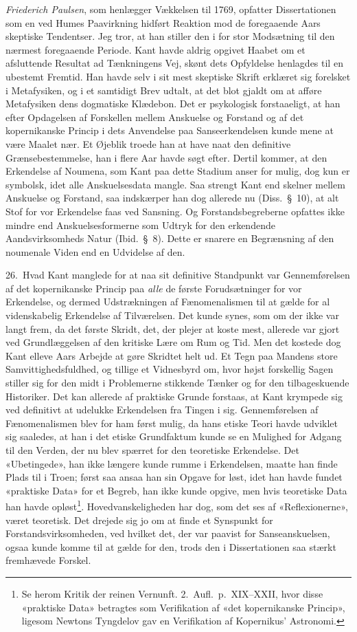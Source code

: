 \documentclass[12pt,a4paper]{article}
\newcommand{\apage}[1]{\marginnote{\footnotesize\textit{[#1]}}}
\begin{document}
\emph{Friederich Paulsen}, som henlægger Vækkelsen til 1769, opfatter
Dissertationen som en ved Humes Paavirkning hidført Reaktion mod de
foregaaende Aars skeptiske Tendentser. Jeg tror, at han stiller den i for
stor Modsætning til den nærmest foregaaende Periode. Kant havde aldrig
opgivet Haabet om et afsluttende Resultat ad Tænkningens Vej, skønt dets
Opfyldelse henlagdes til en ubestemt Fremtid. Han havde selv i sit mest
skeptiske Skrift erklæret sig forelsket i Metafysiken, og i et samtidigt
Brev udtalt, at det blot gjaldt om at afføre Metafysiken dens dogmatiske
Klædebon. Det er psykologisk forstaaeligt, at han efter Opdagelsen af
Forskellen mellem Anskuelse og Forstand og af det kopernikanske Princip i
dets Anvendelse paa Sanseerkendelsen kunde mene at være Maalet nær. Et
Øjeblik troede han at have naat den definitive Grænsebestemmelse, han i
flere Aar havde søgt efter. Dertil kommer, at den Erkendelse af Noumena,
som Kant paa dette Stadium anser for mulig, dog kun er symbolsk, idet
alle Anskuelsesdata mangle. Saa strengt Kant end skelner mellem Anskuelse
og Forstand, saa indskærper han dog allerede nu (Diss.\ §\ 10), at alt
Stof for vor Erkendelse faas ved Sansning. Og Forstandsbegreberne \apage{51}  opfattes
ikke mindre end Anskuelsesformerne som Udtryk for den erkendende
Aandsvirksomheds Natur (Ibid.\ §\ 8). Dette er snarere en Begrænsning af
den noumenale Viden end en Udvidelse af den.

26.\ Hvad Kant manglede for at naa sit definitive Standpunkt var
Gennemførelsen af det kopernikanske Princip paa \emph{alle} de første
Forudsætninger for vor Erkendelse, og dermed Udstrækningen af
Fænomenalismen til at gælde for al videnskabelig Erkendelse af
Tilværelsen. Det kunde synes, som om der ikke var langt frem, da det
første Skridt, det, der plejer at koste mest, allerede var gjort ved
Grundlæggelsen af den kritiske Lære om Rum og Tid. Men det kostede dog
Kant elleve Aars Arbejde at gøre Skridtet helt ud. Et Tegn paa Mandens
store Samvittighedsfuldhed, og tillige et Vidnesbyrd om, hvor højst
forskellig Sagen stiller sig for den midt i Problemerne stikkende Tænker
og for den tilbageskuende Historiker. Det kan allerede af praktiske
Grunde forstaas, at Kant krympede sig ved definitivt at udelukke
Erkendelsen fra Tingen i sig. Gennemførelsen af Fænomenalismen blev for
ham først mulig, da hans etiske Teori havde udviklet sig saaledes, at han
i det etiske Grundfaktum kunde se en Mulighed for Adgang til den Verden,
der nu blev spærret for den teoretiske Erkendelse. Det «Ubetingede», han
ikke længere kunde rumme i Erkendelsen, maatte han finde Plads til i
Troen; først saa ansaa han sin Opgave for løst, idet han havde fundet
«praktiske Data» for et Begreb, han ikke kunde opgive, men hvis teoretiske
Data han havde opløst\footnote{Se herom Kritik der reinen
Vernunft. 2.\ Aufl.\ p.\ XIX--XXII, hvor disse «praktiske Data»
betragtes som Verifikation af «det kopernikanske Princip», ligesom
Newtons Tyngdelov gav en Verifikation af Kopernikus' Astronomi.}.
Hovedvanskeligheden har dog, som det ses af «Reflexionerne», været
teoretisk. Det drejede sig jo om at finde et Synspunkt for
Forstandsvirksomheden, ved hvilket det, der var paavist for
Sanseanskuelsen, ogsaa kunde komme til at gælde for den, trods den i
Dissertationen saa stærkt fremhævede Forskel.
\end{document}
